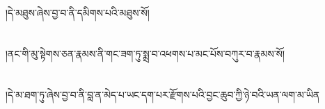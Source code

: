 །དེ་མཐུས་ཞེས་བྱ་བ་ནི་དམིགས་པའི་མཐུས་སོ།\chapter{ }།ནང་གི་མུ་སྟེགས་ཅན་རྣམས་ནི་གང་ཟག་ཏུ་སྨྲ་བ་འཕགས་པ་མང་པོས་བཀུར་བ་རྣམས་སོ།\chapter{ }།དེ་མ་ཐག་ཏུ་ཞེས་བྱ་བ་ནི་བླ་ན་མེད་པ་ཡང་དག་པར་རྫོགས་པའི་བྱང་ཆུབ་ཀྱི་ཉེ་བའི་ཡན་ལག་མ་ཡིན